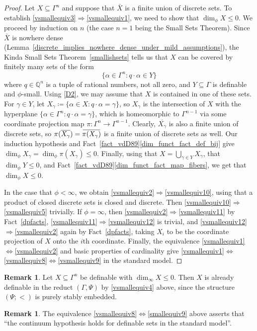 \documentclass[11pt]{amsart}
\theoremstyle{plain}
\theoremstyle{definition}
\newtheorem{remark}[thm]{Remark}
\numberwithin{equation}{section}
\newcommand\Q{\mathbb{Q}}
\newcommand\0{\varnothing}
\newcommand{\overbar}[1]{\mkern 2mu\overline{\mkern-2mu#1\mkern-2mu}\mkern 2mu}
\begin{document}
\begin{proof}
Let $X\subseteq \Gamma^n$ and suppose that $\bar{X}$ is a finite union of discrete sets. 
To establish \eqref{vsmallequiv3}$\Rightarrow$\eqref{vsmallequiv1}, we need to show that $\dim_\phi X \leq 0$. We proceed by induction on $n$ (the case $n=1$ being the Small Sets Theorem). Since $\bar{X}$ is nowhere dense (Lemma~\ref{discrete_implies_nowhere_dense_under_mild_assumptions}),
 the Kinda Small Sets Theorem~\ref{smallishsets} tells us that $X$ can be covered by finitely many sets of the form
\[
\{\alpha \in \Gamma^n:q\cdot \alpha \in Y\}
\]
where $q \in \Q^n$ is a tuple of rational numbers, not all zero, and $Y\subseteq \Gamma$ is definable and $\phi$-small. Using \ref{D2}, we may assume that $X$ is contained in one of these sets. For $\gamma \in Y$, let $X_\gamma\coloneqq\{\alpha \in X:q\cdot \alpha = \gamma\}$, so $X_\gamma$ is the intersection of $X$ with the hyperplane $\{\alpha \in \Gamma^n:q\cdot \alpha =\gamma\}$, which is homeomorphic to $\Gamma^{n-1}$ via some coordinate projection  map $\pi\colon \Gamma^n\to \Gamma^{n-1}$. Clearly, $\overline{X_\gamma}$ is also a finite union of discrete sets, so $\pi(\overline{X_\gamma})= \overbar{\pi(X_\gamma)}$ is a finite union of discrete sets as well. Our induction hypothesis and Fact~\ref{fact_vdD89}\eqref{dim_funct_fact_def_bij} give $\dim_\phi X_\gamma = \dim_\phi \pi(X_\gamma)\leq 0$. Finally, using that  $X = \bigcup_{\gamma \in Y}X_\gamma$, that $\dim_\phi Y\leq 0$, and Fact~\ref{fact_vdD89}\eqref{dim_funct_fact_map_fibers}, we get that $\dim_\phi X \leq 0$. 

In the case that $\phi<\infty$, we obtain \eqref{vsmallequiv2}$\Rightarrow$\eqref{vsmallequiv10}, using that a product of closed discrete sets is closed and discrete. Then \eqref{vsmallequiv10}$\Rightarrow$\eqref{vsmallequiv5} trivially. If $\phi = \infty$, then \eqref{vsmallequiv2}$\Rightarrow$\eqref{vsmallequiv11} by Fact~\ref{dpfacts}, \eqref{vsmallequiv11}$\Rightarrow$\eqref{vsmallequiv12} is trivial, and \eqref{vsmallequiv12}$\Rightarrow$\eqref{vsmallequiv2} again by Fact~\ref{dpfacts}, taking $X_i$ to be the coordinate projection of $X$ onto the $i$th coordinate. Finally, the equivalence \eqref{vsmallequiv1}$\Leftrightarrow$\eqref{vsmallequiv2} and basic properties of cardinality give \eqref{vsmallequiv1}$\Leftrightarrow$\eqref{vsmallequiv8}$\Leftrightarrow$\eqref{vsmallequiv9} in the standard model.
\end{proof}

\begin{remark}\label{dim0_definable_in_pair}
Let $X \subseteq \Gamma^n$ be definable with $\dim_\infty X\leq 0$. Then $X$ is already definable in the reduct $(\Gamma,\Psi)$ by \eqref{vsmallequiv4} above, since the structure $(\Psi;<)$ is purely stably embedded. 
\end{remark}
\begin{remark}
The equivalence \eqref{vsmallequiv8}$\Leftrightarrow$\eqref{smallequiv9} above asserts that ``the continuum hypothesis holds for definable sets in the standard model''.
\end{remark}
\end{document}
